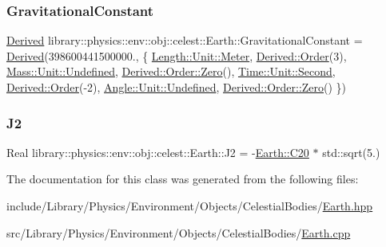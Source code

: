 \subsubsection{\texorpdfstring{Gravitational\+Constant}{GravitationalConstant}}
{\footnotesize\ttfamily \hyperlink{classlibrary_1_1physics_1_1units_1_1_derived}{Derived} library\+::physics\+::env\+::obj\+::celest\+::\+Earth\+::\+Gravitational\+Constant = \hyperlink{classlibrary_1_1physics_1_1units_1_1_derived}{Derived}(398600441500000., \{ \hyperlink{classlibrary_1_1physics_1_1units_1_1_length_a3b8b39cd245cf6b19dc34459baeccb18a17c9c40b9db5a0983d1075a012c1f90a}{Length\+::\+Unit\+::\+Meter}, \hyperlink{classlibrary_1_1physics_1_1units_1_1_derived_1_1_order}{Derived\+::\+Order}(3), \hyperlink{classlibrary_1_1physics_1_1units_1_1_mass_a95f1e0434bc16794926b8e273bc2a54baec0fc0100c4fc1ce4eea230c3dc10360}{Mass\+::\+Unit\+::\+Undefined}, \hyperlink{classlibrary_1_1physics_1_1units_1_1_derived_1_1_order_ad001256340bff8a9c55156f9c45d4969}{Derived\+::\+Order\+::\+Zero}(), \hyperlink{classlibrary_1_1physics_1_1units_1_1_time_ab876a6a05c9a2f28905f2753bfd64109ac22cf8376b1893dcfcef0649fe1a7d87}{Time\+::\+Unit\+::\+Second}, \hyperlink{classlibrary_1_1physics_1_1units_1_1_derived_1_1_order}{Derived\+::\+Order}(-\/2), \hyperlink{classlibrary_1_1physics_1_1units_1_1_angle_a3c329d415a61783b16ce481874cc5956aec0fc0100c4fc1ce4eea230c3dc10360}{Angle\+::\+Unit\+::\+Undefined}, \hyperlink{classlibrary_1_1physics_1_1units_1_1_derived_1_1_order_ad001256340bff8a9c55156f9c45d4969}{Derived\+::\+Order\+::\+Zero}() \})\hspace{0.3cm}{\ttfamily [static]}}

\mbox{\label{classlibrary_1_1physics_1_1env_1_1obj_1_1celest_1_1_earth_a45eb6624c62b847e0f2c59f7b6a7aad5}} 
\subsubsection{\texorpdfstring{J2}{J2}}
{\footnotesize\ttfamily Real library\+::physics\+::env\+::obj\+::celest\+::\+Earth\+::\+J2 = -\/\hyperlink{classlibrary_1_1physics_1_1env_1_1obj_1_1celest_1_1_earth_a0acd5f5fe99a0aacc7175fe0a140360f}{Earth\+::\+C20} $\ast$ std\+::sqrt(5.)\hspace{0.3cm}{\ttfamily [static]}}



The documentation for this class was generated from the following files\+:\begin{DoxyCompactItemize}
\item 
include/\+Library/\+Physics/\+Environment/\+Objects/\+Celestial\+Bodies/\hyperlink{_earth_8hpp}{Earth.\+hpp}\item 
src/\+Library/\+Physics/\+Environment/\+Objects/\+Celestial\+Bodies/\hyperlink{_earth_8cpp}{Earth.\+cpp}\end{DoxyCompactItemize}
